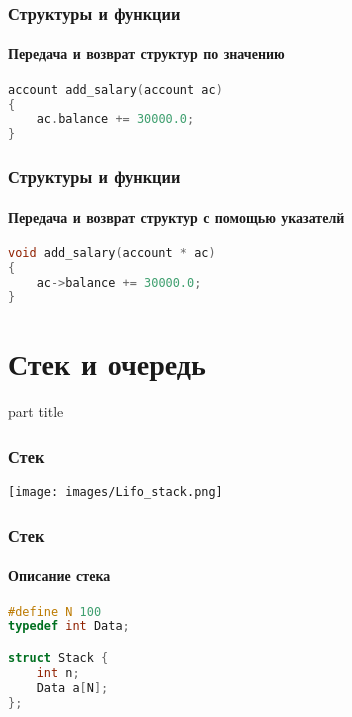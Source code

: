 \documentclass[14pt,pdf,hyperref={unicode}]{beamer}
\begin{document}
\begin{frame}[fragile]
\frametitle{Структуры и функции} 
\framesubtitle{Передача и возврат структур по значению} 

\begin{lstlisting}[language=C++,basicstyle=\ttfamily,keywordstyle=\color{blue}]
account add_salary(account ac)
{
    ac.balance += 30000.0;
}
\end{lstlisting}
\end{frame}

\begin{frame}[fragile]
\frametitle{Структуры и функции} 
\framesubtitle{Передача и возврат структур с помощью указателй} 

\begin{lstlisting}[language=C++,basicstyle=\ttfamily,keywordstyle=\color{blue}]
void add_salary(account * ac)
{
    ac->balance += 30000.0;
}
\end{lstlisting}
\end{frame}




\section{Стек и очередь}
\begin{frame}
\begin{center}
\begin{beamercolorbox}[sep=8pt,center]{part
title}
\insertsection
\end{beamercolorbox}
\end{center}
\end{frame}



\begin{frame}[fragile]
\frametitle{Стек} 
\begin{center}
\texttt{[image: images/Lifo\_stack.png]}
\end{center}
\end{frame}


\begin{frame}[fragile]
\frametitle{Стек} 
\framesubtitle{Описание стека} 

\begin{lstlisting}[language=C++,basicstyle=\ttfamily,keywordstyle=\color{blue}]
#define N 100
typedef int Data;

struct Stack {
    int n;
    Data a[N];
};
\end{lstlisting}
\end{frame}
\end{document}
